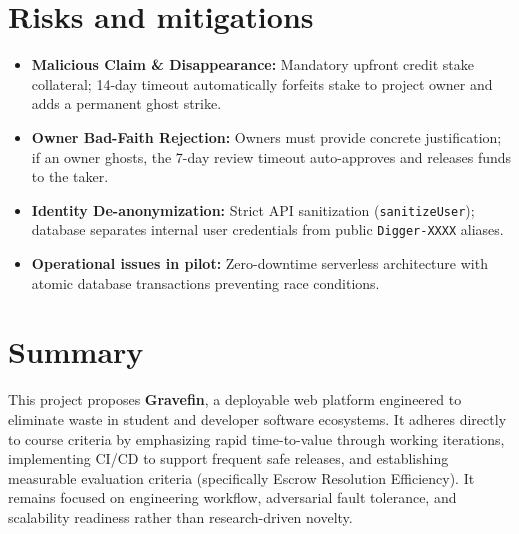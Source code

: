 \documentclass[11pt,a4paper]{article}
\begin{document}
\section{Risks and mitigations}
\begin{itemize}
    \item \textbf{Malicious Claim \& Disappearance:} Mandatory upfront credit stake collateral; 14-day timeout automatically forfeits stake to project owner and adds a permanent ghost strike.
    \item \textbf{Owner Bad-Faith Rejection:} Owners must provide concrete justification; if an owner ghosts, the 7-day review timeout auto-approves and releases funds to the taker.
    \item \textbf{Identity De-anonymization:} Strict API sanitization (\texttt{sanitizeUser}); database separates internal user credentials from public \texttt{Digger-XXXX} aliases.
    \item \textbf{Operational issues in pilot:} Zero-downtime serverless architecture with atomic database transactions preventing race conditions.
\end{itemize}

\section{Summary}
This project proposes \textbf{Gravefin}, a deployable web platform engineered to eliminate waste in student and developer software ecosystems. It adheres directly to course criteria by emphasizing rapid time-to-value through working iterations, implementing CI/CD to support frequent safe releases, and establishing measurable evaluation criteria (specifically Escrow Resolution Efficiency). It remains focused on engineering workflow, adversarial fault tolerance, and scalability readiness rather than research-driven novelty.
\end{document}
